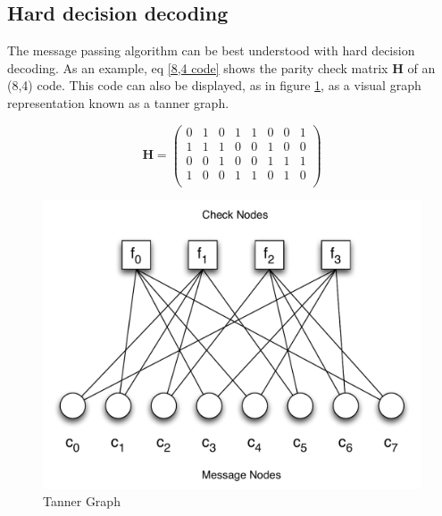 \documentclass[11pt]{article}
\numberwithin{equation}{subsection}
\begin{document}
\subsection{Hard decision decoding}
The message passing algorithm can be best understood with hard decision decoding. As an example, eq \ref{8,4 code} shows the parity check matrix $\mathbf{H}$ of an (8,4) code. This code can also be displayed, as in figure \ref{figure:tanner graph}, as a visual graph representation known as a tanner graph. \cite{leiner2005ldpc}

\begin{equation} \label{8,4 code} 
\mathbf{H} = 
\left(
\begin{array}{cccccccc}
  0 & 1 & 0 & 1 & 1 & 0 & 0 & 1 \\
  1 & 1 & 1 & 0 & 0 & 1 & 0 & 0 \\
  0 & 0 & 1 & 0 & 0 & 1 & 1 & 1 \\
  1 & 0 & 0 & 1 & 1 & 0 & 1 & 0 \\
\end{array}
\right)
\end{equation}

\begin{figure}[h]
\centering
\includegraphics[scale=0.6]{tannergraph}
\caption{Tanner Graph}
\label{figure:tanner graph}
\end{figure}
\end{document}
